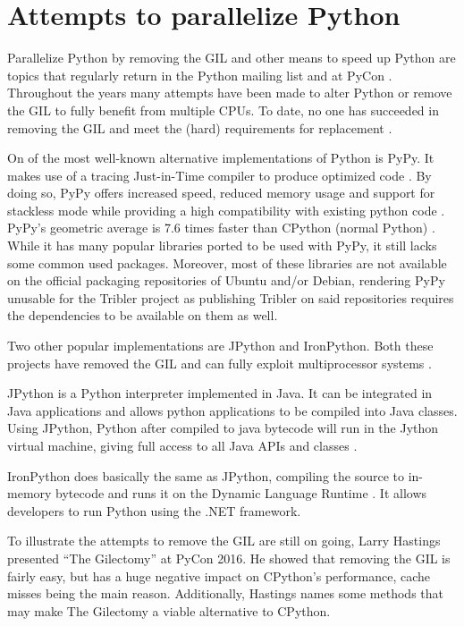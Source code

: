 \section{Attempts to parallelize Python}
\label{sct:removing_the_gil}

Parallelize Python by removing the GIL and other means to speed up Python are topics that regularly return in the Python mailing list and at PyCon \cite{python2015global}.
Throughout the years many attempts have been made to alter Python or remove the GIL to fully benefit from multiple CPUs.
To date, no one has succeeded in removing the GIL and meet the (hard) requirements for replacement \cite{python2015global}.

On of the most well-known alternative implementations of Python is PyPy.
It makes use of a tracing Just-in-Time compiler to produce optimized code \cite{bolz2009tracing}.
By doing so, PyPy offers increased speed, reduced memory usage and support for stackless mode while providing a high compatibility with existing python code \cite{pypy2016pypy}.
PyPy's geometric average is 7.6 times faster than CPython (normal Python) \cite{pypy2016speed}.
While it has many popular libraries ported to be used with PyPy, it still lacks some common used packages.
Moreover, most of these libraries are not available on the official packaging repositories of Ubuntu and/or Debian, rendering PyPy unusable for the Tribler project as publishing Tribler on said repositories requires the dependencies to be available on them as well.

Two other popular implementations are JPython and IronPython.
Both these projects have removed the GIL and can fully exploit multiprocessor systems \cite{python2015global}.

JPython is a Python interpreter implemented in Java. It can be integrated in Java applications and allows python applications to be compiled into Java classes.
Using JPython, Python after compiled to java bytecode will run in the Jython virtual machine, giving full access to all Java APIs and classes \cite{jython2016why}.

IronPython does basically the same as JPython, compiling the source to in-memory bytecode and runs it on the Dynamic Language Runtime \cite{ironpython2014}.
It allows developers to run Python using the .NET framework.

To illustrate the attempts to remove the GIL are still on going, Larry Hastings presented \enquote{The Gilectomy} at PyCon 2016.
He showed that removing the GIL is fairly easy, but has a huge negative impact on CPython's performance, cache misses being the main reason.
Additionally, Hastings names some methods that may make The Gilectomy a viable alternative to CPython.\\

